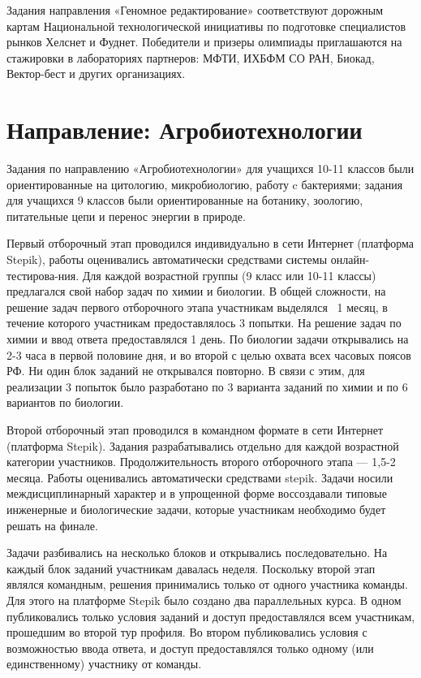 Задания направления «Геномное редактирование» соответствуют дорожным картам Национальной технологической инициативы по подготовке специалистов рынков Хелснет и Фуднет. Победители и призеры олимпиады приглашаются на стажировки в лабораториях партнеров: МФТИ, ИХБФМ СО РАН, Биокад, Вектор-бест и других организациях. 

\section*{Направление: Агробиотехнологии}

Задания по направлению «Агробиотехнологии» для учащихся 10-11 классов были ориентированные на цитологию, микробиологию, работу c бактериями; задания для учащихся 9 классов были ориентированные на ботанику, зоологию, питательные цепи и перенос энергии в природе.   

Первый отборочный этап проводился индивидуально в сети Интернет (платформа Stepik), работы оценивались автоматически средствами системы онлайн-тестирова-ния. Для каждой возрастной группы (9 класс или 10-11 классы) предлагался свой набор задач по химии и биологии. В общей сложности, на решение задач первого отборочного этапа участникам выделялся ~1 месяц, в течение которого участникам предоставлялось 3 попытки. На решение задач по химии и ввод ответа предоставлялся 1 день. По биологии задачи открывались на 2-3 часа в первой половине дня, и во второй с целью охвата всех часовых поясов РФ. Ни один блок заданий не открывался повторно. В связи с этим, для реализации 3 попыток было  разработано по 3 варианта заданий по химии и по 6 вариантов по биологии. 
 
Второй отборочный этап проводился в командном формате в сети Интернет (платформа Stepik). Задания разрабатывались отдельно для каждой возрастной категории участников. Продолжительность второго отборочного этапа — 1,5-2 месяца. Работы оценивались автоматически средствами stepik. Задачи носили междисциплинарный характер и в упрощенной форме воссоздавали типовые инженерные и биологические задачи, которые участникам необходимо будет решать на финале.

Задачи разбивались на несколько блоков и открывались последовательно. На каждый блок заданий участникам давалась неделя. Поскольку второй этап являлся командным, решения принимались только от одного участника команды. Для этого на платформе Stepik было создано два параллельных курса. В одном публиковались только условия заданий и доступ предоставлялся всем участникам, прошедшим во второй тур профиля. Во втором публиковались условия с возможностью ввода ответа, и доступ предоставлялся только одному (или единственному) участнику от команды.

